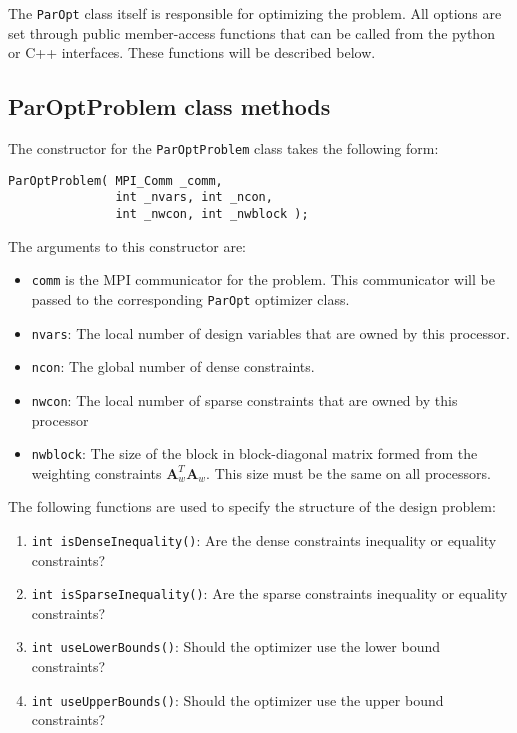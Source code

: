 \documentclass[12pt]{article}
\newcommand{\mb}{\mathbf}
\begin{document}
The \texttt{ParOpt} class itself is responsible for optimizing the problem.
All options are set through public member-access functions that can be called from the python or C++ interfaces.
These functions will be described below.

\subsection{ParOptProblem class methods}

The constructor for the \texttt{ParOptProblem} class takes the following form:
%
\begin{verbatim}
ParOptProblem( MPI_Comm _comm,
               int _nvars, int _ncon,
               int _nwcon, int _nwblock );
\end{verbatim}

The arguments to this constructor are:
\begin{itemize}
\item \texttt{comm} is the MPI communicator for the problem. 
This communicator will be passed to the corresponding \texttt{ParOpt} optimizer class.

\item \texttt{nvars}: The local number of design variables that are owned by this processor.

\item \texttt{ncon}: The global number of dense constraints.

\item \texttt{nwcon}: The local number of sparse constraints that are owned by this processor

\item \texttt{nwblock}: The size of the block in block-diagonal matrix formed from the weighting constraints $\mb{A}_{w}^{T}\mb{A}_{w}$. This size must be the same on all processors.
\end{itemize}

The following functions are used to specify the structure of the design problem:
\begin{enumerate}
\item \texttt{int isDenseInequality()}: Are the dense constraints inequality or equality constraints?
\item \texttt{int isSparseInequality()}: Are the sparse constraints inequality or equality constraints?
\item \texttt{int useLowerBounds()}: Should the optimizer use the lower bound constraints?
\item \texttt{int useUpperBounds()}: Should the optimizer use the upper bound constraints?
\end{enumerate}
\end{document}
